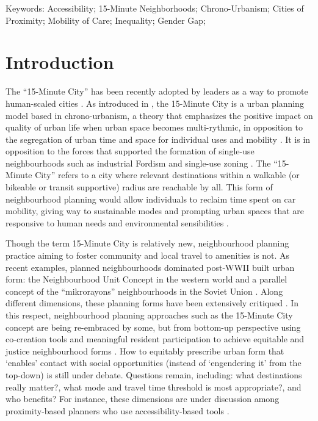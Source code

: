 \documentclass[
  authoryear,
  preprint,
  3p]{elsarticle}
\begin{document}
Keywords: Accessibility; 15-Minute Neighborhoods; Chrono-Urbanism;
Cities of Proximity; Mobility of Care; Inequality; Gender Gap;

\section{Introduction}\label{introduction}

The ``15-Minute City'' has been recently adopted by leaders as a way to
promote human-scaled cities
\citep{teixeiraClassifying15minuteCities2024}. As introduced in
\citet{moreno_introducing_2021}, the 15-Minute City is a urban planning
model based in chrono-urbanism, a theory that emphasizes the positive
impact on quality of urban life when urban space becomes multi-rythmic,
in opposition to the segregation of urban time and space for individual
uses and mobility
\citep{mulicekUrbanRhythmsChronotopic2015, morenoVilleQuartHeure2016}.
It is in opposition to the forces that supported the formation of
single-use neighbourhoods such as industrial Fordism and single-use
zoning
\citep{mulicekUrbanRhythmsChronotopic2015, morenoVilleQuartHeure2016}.
The ``15-Minute City'' refers to a city where relevant destinations
within a walkable (or bikeable or transit supportive) radius are
reachable by all. This form of neighbourhood planning would allow
individuals to reclaim time spent on car mobility, giving way to
sustainable modes and prompting urban spaces that are responsive to
human needs and environmental sensibilities \citep{Allam2022}.

Though the term 15-Minute City is relatively new, neighbourhood planning
practice aiming to foster community and local travel to amenities is
not. As recent examples, planned neighbourhoods dominated post-WWII
built urban form: the Neighbourhood Unit Concept in the western world
\citep{brodyNeighbourhoodUnitConcept2013} and a parallel concept of the
``mikrorayons'' neighbourhoods in the Soviet Union
\citep{kissfazekasCircleParadigms15minute2022}. Along different
dimensions, these planning forms have been extensively critiqued
\citep{talenSocialSciencePlanned2017}. In this respect, neighbourhood
planning approaches such as the 15-Minute City concept are being
re-embraced by some, but from bottom-up perspective using co-creation
tools and meaningful resident participation to achieve equitable and
justice neighbourhood forms \citep{mahmoudCocreationPathwayUrban2021}.
How to equitably prescribe urban form that `enables' contact with social
opportunities (instead of `engendering it' from the top-down) is still
under debate. Questions remain, including: what destinations really
matter?, what mode and travel time threshold is most appropriate?, and
who benefits? For instance, these dimensions are under discussion among
proximity-based planners who use accessibility-based tools
\citep{silvaProximitycentredAccessibilityConceptual2023, silvaRegionalAccessibilityUndermining2022, guzmanProximityEnoughCritical2024}.
\end{document}

